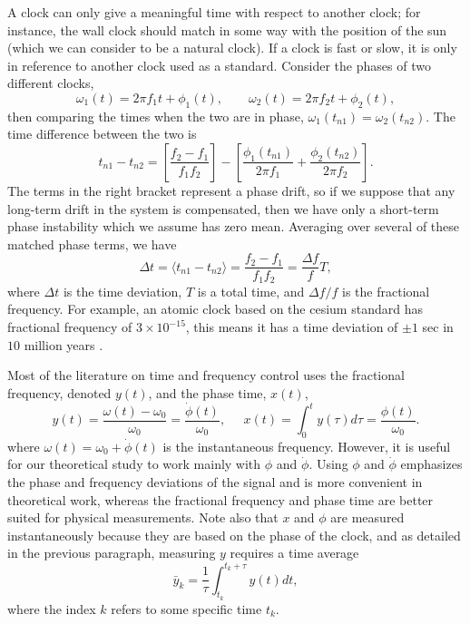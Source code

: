 A clock can only give a meaningful time with respect to another clock; for instance, the wall clock should match in some way with the position of the sun (which we can consider to be a natural clock). If a clock is fast or slow, it is only in reference to another clock used as a standard. Consider the phases of two different clocks,
%
\begin{equation}
\omega_1(t) = 2\pi f_1t + \phi_1(t), \qquad \omega_2(t) = 2\pi f_2t + \phi_2(t),
\end{equation}
%
then comparing the times when the two are in phase, $\omega_1(t_{n1}) = \omega_2(t_{n2})$. The time difference between the two is
%
\begin{equation}
t_{n1} - t_{n2} = \left[\frac{f_2 - f_1}{f_1f_2}\right] - \left[\frac{\phi_1(t_{n1})}{2\pi f_1} + \frac{\phi_2(t_{n2})}{2\pi f_2}\right].
\end{equation}
%
The terms in the right bracket represent a phase drift, so if we suppose that any long-term drift in the system is compensated, then we have only a short-term phase instability which we assume has zero mean. Averaging over several of these matched phase terms, we have
%
\begin{equation}
\Delta t = \langle t_{n1} - t_{n2} \rangle = \frac{f_2 - f_1}{f_1f_2} = \frac{\Delta f}{f}T,
\end{equation}
%
where $\Delta t$ is the time deviation, $T$ is a total time, and $\Delta f/f$ is the fractional frequency. For example, an atomic clock based on the cesium standard has fractional frequency of $3 \times 10^{-15}$, this means it has a time deviation of $\pm 1$ sec in $10$ million years \cite{CsFracFreq}.

Most of the literature on time and frequency control uses the fractional frequency, denoted $y(t)$, and the phase time, $x(t)$, \cite{Kartaschoff1978, Allan1974, Riley1994}
%
\begin{equation}
\label{eq:phasefreqquantities}
y(t) = \frac{\omega(t) - \omega_0}{\omega_0} = \frac{\dot{\phi}(t)}{\omega_0}, \;\;\;\;\; x(t) = \int_0^t y(\tau)d\tau = \frac{\phi(t)}{\omega_0}.
\end{equation}
%
where $\omega(t) = \omega_0 + \dot{\phi}(t)$ is the instantaneous frequency. However, it is useful for our theoretical study to work mainly with $\phi$ and $\dot{\phi}$. Using $\phi$ and $\dot{\phi}$ emphasizes the phase and frequency deviations of the signal and is more convenient in theoretical work, whereas the fractional frequency and phase time are better suited for physical measurements. Note also that $x$ and $\phi$ are measured instantaneously because they are based on the phase of the clock, and as detailed in the previous paragraph, measuring $y$ requires a time average
%
\begin{equation} \label{eq:avgy}
\bar{y}_k = \frac{1}{\tau}\int_{t_k}^{t_k+\tau} y(t)dt,
\end{equation}
%
where the index $k$ refers to some specific time $t_k$.


